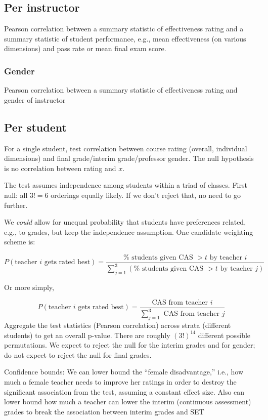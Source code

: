 \documentclass[12pt]{article}
\newcommand{\todo}[1]{{\color{red}{TO DO: \sc #1}}}
\begin{document}
\subsection{Per instructor}
Pearson correlation between a summary statistic of effectiveness rating and a summary statistic
of student performance, e.g., mean effectiveness (on various dimensions) and pass rate or mean
final exam score.
\todo{code is ready.  Do we do all metrics?}

\subsubsection{Gender}
Pearson correlation between a summary statistic of effectiveness rating and gender of instructor
\todo{code is ready.  Do we do all metrics?}

\subsection{Per student}
For a single student, test correlation between course rating (overall, individual dimensions) and final grade/interim grade/professor gender.
The null hypothesis is no correlation between rating and $x$.

The test assumes independence among students within a triad of classes.
First null: all $3! = 6$ orderings equally likely.
If we don't reject that, no need to go further.

We \emph{could} allow for unequal probability that students have preferences
related, e.g., to grades, but keep the independence assumption.
One candidate weighting scheme is:

$$P(\text{teacher $i$ gets rated best}) = \frac{\%\text{ students given CAS }> t\text{ by teacher $i$}}{\sum_{j=1}^3(\%\text{ students given CAS }> t\text{ by teacher }j)}$$
 
Or more simply, 

$$P(\text{teacher $i$ gets rated best}) = \frac{\text{CAS from teacher $i$}}{\sum_{j=1}^3\text{ CAS from teacher }j}$$
Aggregate the test statistics (Pearson correlation) across strata (different students) to get an overall p-value.  There are roughly $(3!)^{14}$ different possible permutations.
We expect to reject the null for the interim grades and for gender; do not expect to reject the null for final grades.
 
Confidence bounds:
We can lower bound the ``female disadvantage,'' i.e., 
how much a female teacher needs to improve her ratings in order to destroy the 
significant association from the test, assuming a constant effect size.
Also can lower bound how much a teacher can lower the interim (continuous assessment) grades to break the association between interim grades and SET
\end{document}
